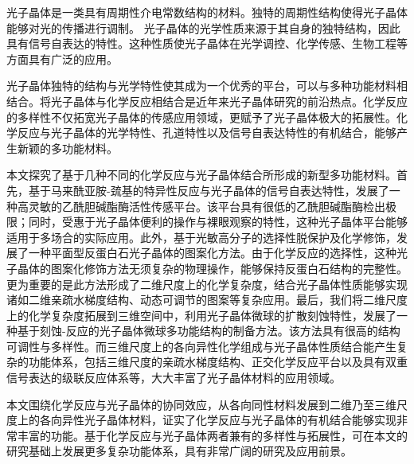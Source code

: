 \begin{cabstract}
  光子晶体是一类具有周期性介电常数结构的材料。独特的周期性结构使得光子晶体能够对光的传播进行调制。
  光子晶体的光学性质来源于其自身的独特结构，因此具有信号自表达的特性。这种性质使光子晶体在光学调控、化学传感、生物工程等方面具有广泛的应用。

  光子晶体独特的结构与光学特性使其成为一个优秀的平台，可以与多种功能材料相结合。将光子晶体与化学反应相结合是近年来光子晶体研究的前沿热点。化学反应的多样性不仅拓宽光子晶体的传感应用领域，更赋予了光子晶体极大的拓展性。化学反应与光子晶体的光学特性、孔道特性以及信号自表达特性的有机结合，能够产生新颖的多功能材料。

  本文探究了基于几种不同的化学反应与光子晶体结合所形成的新型多功能材料。首先，基于马来酰亚胺-巯基的特异性反应与光子晶体的信号自表达特性，发展了一种高灵敏的乙酰胆碱酯酶活性传感平台。该平台具有很低的乙酰胆碱酯酶检出极限；同时，受惠于光子晶体便利的操作与裸眼观察的特性，这种光子晶体平台能够适用于多场合的实际应用。此外，基于光敏高分子的选择性脱保护及化学修饰，发展了一种平面型反蛋白石光子晶体的图案化方法。由于化学反应的选择性，这种光子晶体的图案化修饰方法无须复杂的物理操作，能够保持反蛋白石结构的完整性。更为重要的是此方法形成了二维尺度上的化学复杂度，结合光子晶体性质能够实现诸如二维亲疏水梯度结构、动态可调节的图案等复杂应用。最后，我们将二维尺度上的化学复杂度拓展到三维空间中，利用光子晶体微球的扩散刻蚀特性，发展了一种基于刻蚀-反应的光子晶体微球多功能结构的制备方法。该方法具有很高的结构可调性与多样性。而三维尺度上的各向异性化学组成与光子晶体性质结合能产生复杂的功能体系，包括三维尺度的亲疏水梯度结构、正交化学反应平台以及具有双重信号表达的级联反应体系等，大大丰富了光子晶体材料的应用领域。

  本文围绕化学反应与光子晶体的协同效应，从各向同性材料发展到二维乃至三维尺度上的各向异性光子晶体材料，证实了化学反应与光子晶体的有机结合能够实现非常丰富的功能。基于化学反应与光子晶体两者兼有的多样性与拓展性，可在本文的研究基础上发展更多复杂功能体系，具有非常广阔的研究及应用前景。

\end{cabstract}


